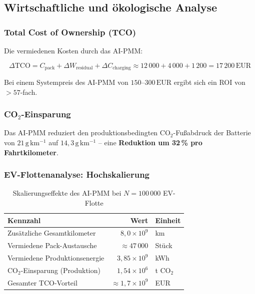 ﻿\documentclass[12pt,a4paper]{article}
\begin{document}
	\subsection{Wirtschaftliche und ökologische Analyse}
	
	\subsubsection{Total Cost of Ownership (TCO)}
	
	Die vermiedenen Kosten durch das AI-PMM:
	
	\begin{equation}
		\Delta\mathrm{TCO} = C_\mathrm{pack} + \Delta W_\mathrm{residual}
		+ \Delta C_\mathrm{charging}
		\approx 12\,000 + 4\,000 + 1\,200 = 17\,200\,\text{EUR}
		\label{eq:tco}
	\end{equation}
	
	Bei einem Systempreis des AI-PMM von $150\text{--}300\,\text{EUR}$ ergibt
	sich ein ROI von $> 57$-fach.
	
	\subsubsection{CO$_2$-Einsparung}
	
	Das AI-PMM reduziert den produktionsbedingten CO$_2$-Fußabdruck der Batterie
	von $21\,\mathrm{g\,km^{-1}}$ auf $14{,}3\,\mathrm{g\,km^{-1}}$ -- eine
	\textbf{Reduktion um 32\,\% pro Fahrtkilometer}.
	
	\subsubsection{EV-Flottenanalyse: Hochskalierung}
	
	\begin{table}[H]
		\centering
		\caption{Skalierungseffekte des AI-PMM bei $N = 100\,000$ EV-Flotte}
		\label{tab:fleet}
		\begin{tabular}{lrl}
			\toprule
			\textbf{Kennzahl} & \textbf{Wert} & \textbf{Einheit} \\
			\midrule
			Zusätzliche Gesamtkilometer & $8{,}0 \times 10^9$ & km \\
			Vermiedene Pack-Austausche & $\approx 47\,000$ & Stück \\
			Vermiedene Produktionsenergie & $3{,}85 \times 10^9$ & kWh \\
			CO$_2$-Einsparung (Produktion) & $1{,}54 \times 10^6$ & t CO$_2$ \\
			Gesamter TCO-Vorteil & $\approx 1{,}7 \times 10^9$ & EUR \\
			\bottomrule
		\end{tabular}
	\end{table}
	
\end{document}
